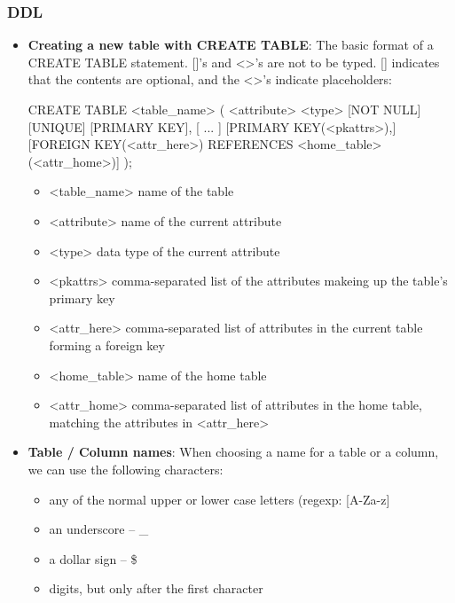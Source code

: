 \documentclass{report}
\begin{document}
        \subsubsection{DDL}
        \begin{itemize}
        \item \textbf{Creating a new table with CREATE TABLE}: The basic format of a CREATE TABLE statement. []’s and <>’s are not to be typed. [] indicates that the contents are optional, and the <>’s indicate placeholders:
            \bigbreak \noindent 
            \begin{sqlcode}
                CREATE TABLE <table_name> (
                    <attribute> <type> [NOT NULL] [UNIQUE] [PRIMARY KEY], [ ... ]
                    [PRIMARY KEY(<pkattrs>),]
                    [FOREIGN KEY(<attr_here>) REFERENCES <home_table>(<attr_home>)]
                );
            \end{sqlcode}
            \begin{itemize}
                \item <table\_name> name of the table
                \item <attribute> name of the current attribute
                \item <type> data type of the current attribute
                \item <pkattrs> comma-separated list of the attributes makeing up the table’s primary key
                \item <attr\_here> comma-separated list of attributes in the current table forming a foreign key
                \item <home\_table> name of the home table
                \item <attr\_home> comma-separated list of attributes in the home table, matching the attributes in <attr\_here>
            \end{itemize}
        \item \textbf{Table / Column names}: When choosing a name for a table or a column, we can use the following characters:
            \begin{itemize}
                \item any of the normal upper or lower case letters (regexp: [A-Za-z]
                \item an underscore – \_
                \item a dollar sign – \$
                \item digits, but only after the first character
            \end{itemize}

\end{itemize}
\end{document}
